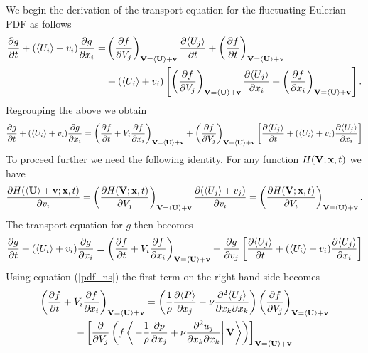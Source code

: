 \documentclass[oneside,a4paper,11pt]{report}
\begin{document}
We begin the derivation of the transport equation for the fluctuating Eulerian PDF as follows 
\begin{align}
\frac{\partial g}{\partial t} + ( \langle U_i \rangle + v_i ) \frac{\partial g}{\partial x_i} = & \left ( \frac{\partial f}{\partial V_j} \right )_{\mathbf{V} = \langle \mathbf{U} \rangle + \mathbf{v}} \frac{\partial \langle U_j \rangle}{\partial t} + \left (\frac{\partial f}{\partial t} \right )_{\mathbf{V} = \langle \mathbf{U} \rangle + \mathbf{v}} \nonumber \\
&+ ( \langle U_i \rangle + v_i ) \left [ \left ( \frac{\partial f}{\partial V_j} \right )_{\mathbf{V} = \langle \mathbf{U} \rangle + \mathbf{v}} \frac{\partial \langle U_j \rangle}{\partial x_i} + \left (\frac{\partial f}{\partial x_i} \right )_{\mathbf{V} = \langle \mathbf{U} \rangle + \mathbf{v}} \right ].
\end{align}
Regrouping the above we obtain
\begin{equation}
\frac{\partial g}{\partial t} + ( \langle U_i \rangle + v_i ) \frac{\partial g}{\partial x_i} = \left ( \frac{\partial f}{\partial t} + V_i \frac{\partial f}{\partial x_i} \right )_{\mathbf{V} = \langle \mathbf{U} \rangle + \mathbf{v}} + \left ( \frac{\partial f}{\partial V_j} \right )_{\mathbf{V} = \langle \mathbf{U} \rangle + \mathbf{v}} \left [ \frac{\partial \langle U_j \rangle}{\partial t} + (\langle U_i \rangle + v_i) \frac{\partial \langle U_j \rangle}{\partial x_i} \right ]
\end{equation}
To proceed further we need the following identity. For any function $H(\mathbf{V}; \mathbf{x}, t)$ we have
\begin{equation}
\label{deriv_v}
\frac{\partial H(\langle \mathbf{U} \rangle + \mathbf{v}; \mathbf{x}, t)}{\partial v_i} = \left ( \frac{\partial H(\mathbf{V}; \mathbf{x}, t)}{\partial V_j} \right)_{\mathbf{V} = \langle \mathbf{U} \rangle + \mathbf{v}} \frac{\partial ( \langle U_j \rangle + v_j) }{\partial v_i} = \left ( \frac{\partial H(\mathbf{V}; \mathbf{x},t )}{\partial V_i} \right)_{\mathbf{V} = \langle \mathbf{U} \rangle + \mathbf{v}}.
\end{equation}
The transport equation for $g$ then becomes
\begin{equation}
\frac{\partial g}{\partial t} + ( \langle U_i \rangle + v_i ) \frac{\partial g}{\partial x_i} = \left ( \frac{\partial f}{\partial t} + V_i \frac{\partial f}{\partial x_i} \right )_{\mathbf{V} = \langle \mathbf{U} \rangle + \mathbf{v}} + \frac{\partial g}{\partial v_j} \left [ \frac{\partial \langle U_j \rangle}{\partial t} + (\langle U_i \rangle + v_i) \frac{\partial \langle U_j \rangle}{\partial x_i} \right ]
\end{equation}
Using equation (\ref{pdf_ns}) the first term on the right-hand side becomes
\begin{multline}
\left ( \frac{\partial f}{\partial t} + V_i \frac{\partial f}{\partial x_i} \right )_{\mathbf{V} = \langle \mathbf{U} \rangle + \mathbf{v}} = \left ( \frac{1}{\rho} \frac{\partial \langle P \rangle}{\partial x_j} -\nu \frac{\partial^2 \langle U_j \rangle}{\partial x_k \partial x_k} \right) \left (\frac{\partial f}{\partial V_j} \right)_{\mathbf{V} = \langle \mathbf{U} \rangle + \mathbf{v}} \\
- \left [ \frac{\partial}{\partial V_j} \left ( f \left < \left . - \frac{1}{\rho} \frac{\partial p}{\partial x_j} +  \nu \frac{\partial ^2 u_j}{\partial x_k \partial x_k} \right | \mathbf{V} \right > \right ) \right ]_{\mathbf{V} = \langle \mathbf{U} \rangle + \mathbf{v}} 
\end{multline}
\end{document}
